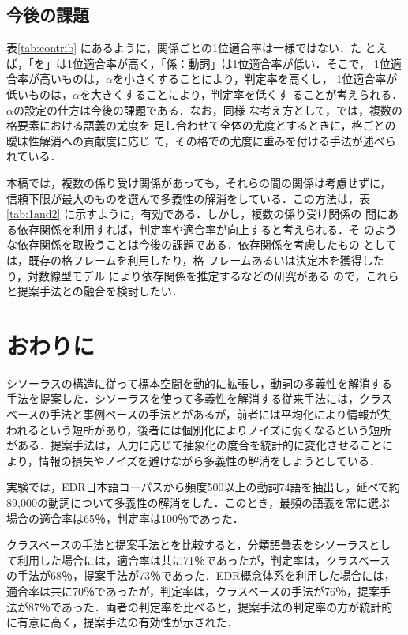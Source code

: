 \subsection{今後の課題}

表\ref{tab:contrib} にあるように，関係ごとの1位適合率は一様ではない．た
とえば，「を」は1位適合率が高く，「係：動詞」は1位適合率が低い．そこで，
1位適合率が高いものは，$\alpha$を小さくすることにより，判定率を高くし，
1位適合率が低いものは，$\alpha$を大きくすることにより，判定率を低くす
ることが考えられる．$\alpha$の設定の仕方は今後の課題である．なお，同様
な考え方として，\cite{Fujii96a}では，複数の格要素における語義の尤度を
足し合わせて全体の尤度とするときに，格ごとの曖昧性解消への貢献度に応じ
て，その格での尤度に重みを付ける手法が述べられている．

本稿では，複数の係り受け関係があっても，それらの間の関係は考慮せずに，
信頼下限が最大のものを選んで多義性の解消をしている．この方法は，表
\ref{tab:1and2} に示すように，有効である．しかし，複数の係り受け関係の
間にある依存関係を利用すれば，判定率や適合率が向上すると考えられる．そ
のような依存関係を取扱うことは今後の課題である．依存関係を考慮したもの
としては，既存の格フレームを利用したり\cite{Kurohashi92,Fujii96a}，格
フレームあるいは決定木を獲得したり\cite{Tanaka95b}，対数線型モデル
\cite{Matsuda88}により依存関係を推定する\cite{Bruce94}などの研究がある
ので，これらと提案手法との融合を検討したい．

\section{おわりに}
\label{sec:conclusion}

シソーラスの構造に従って標本空間を動的に拡張し，動詞の多義性を解消する
手法を提案した．シソーラスを使って多義性を解消する従来手法には，クラス
ベースの手法と事例ベースの手法とがあるが，前者には平均化により情報が失
われるという短所があり，後者には個別化によりノイズに弱くなるという短所
がある．提案手法は，入力に応じて抽象化の度合を統計的に変化させることに
より，情報の損失やノイズを避けながら多義性の解消をしようとしている．

実験では，EDR日本語コーパスから頻度500以上の動詞74語を抽出し，延べで約
89,000の動詞について多義性の解消をした．このとき，最頻の語義を常に選ぶ
場合の適合率は65％，判定率は100％であった．

クラスベースの手法と提案手法とを比較すると，分類語彙表をシソーラスとし
て利用した場合には，適合率は共に71％であったが，判定率は，クラスベース
の手法が68％，提案手法が73％であった．EDR概念体系を利用した場合には，
適合率は共に70％であったが，判定率は，クラスベースの手法が76％，提案手
法が87％であった．両者の判定率を比べると，提案手法の判定率の方が統計的
に有意に高く，提案手法の有効性が示された．

